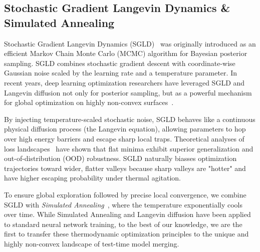 \subsection{Stochastic Gradient Langevin Dynamics \& Simulated Annealing}
Stochastic Gradient Langevin Dynamics (SGLD)~\cite{welling2011bayesian} was originally introduced as an efficient Markov Chain Monte Carlo (MCMC) algorithm for Bayesian posterior sampling.
SGLD combines stochastic gradient descent with coordinate-wise Gaussian noise scaled by the learning rate and a temperature parameter.
In recent years, deep learning optimization researchers have leveraged SGLD and Langevin diffusion not only for posterior sampling, but as a powerful mechanism for global optimization on highly non-convex surfaces~\cite{zhang2020sgld,mandt2017stochastic}.

By injecting temperature-scaled stochastic noise, SGLD behaves like a continuous physical diffusion process (the Langevin equation), allowing parameters to hop over high energy barriers and escape sharp local traps.
Theoretical analyses of loss landscapes~\cite{hochreiter1997flat,keskar2016large,dinh2017sharp} have shown that flat minima exhibit superior generalization and out-of-distribution (OOD) robustness.
SGLD naturally biasses optimization trajectories toward wider, flatter valleys because sharp valleys are "hotter" and have higher escaping probability under thermal agitation.

To ensure global exploration followed by precise local convergence, we combine SGLD with \emph{Simulated Annealing}~\cite{kirkpatrick1983optimization,dekkers1991global}, where the temperature exponentially cools over time.
While Simulated Annealing and Langevin diffusion have been applied to standard neural network training, to the best of our knowledge, we are the first to transfer these thermodynamic optimization principles to the unique and highly non-convex landscape of test-time model merging.